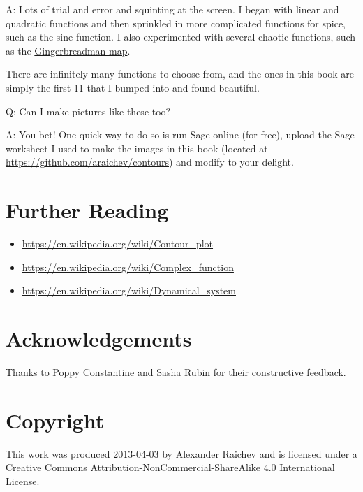 \documentclass[12pt, a4paper]{amsart}
\begin{document}
A: Lots of trial and error and squinting at the screen.
I began with linear and quadratic functions and then sprinkled in more complicated functions for spice, such as the sine function.
I also experimented with several chaotic functions, such as the \href{https://en.wikipedia.org/wiki/Gingerbreadman_map}{Gingerbreadman map}.

There are infinitely many functions to choose from, and the ones in this book are simply the first 11 that I bumped into and found beautiful.

Q: Can I make pictures like these too?

A: You bet!
One quick way to do so is run Sage online (for free), upload the Sage worksheet I used to make the images in this book (located at \url{https://github.com/araichev/contours}) and modify to your delight.
\section*{Further Reading}

\begin{itemize}
    \item \url{https://en.wikipedia.org/wiki/Contour_plot}
    \item \url{https://en.wikipedia.org/wiki/Complex_function} 
    \item \url{https://en.wikipedia.org/wiki/Dynamical_system}
\end{itemize}
\section*{Acknowledgements}

Thanks to Poppy Constantine and Sasha Rubin for their constructive feedback.

\section*{Copyright}

This work was produced 2013-04-03 by Alexander Raichev and is licensed under a \href{http://creativecommons.org/licenses/by-nc-sa/4.0/}{Creative Commons Attribution-NonCommercial-ShareAlike 4.0 International License}.
\end{document}
